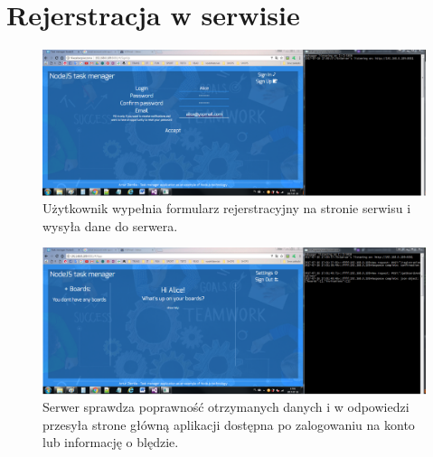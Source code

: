 \documentclass[12pt]{report}
\begin{document}
\section{Rejerstracja w serwisie}
\begin{figure}[!hb]
\centering
\includegraphics[width=\textwidth,height=\textheight,keepaspectratio]{21.png}
\captionsetup{labelformat=empty}
\caption[]{Użytkownik wypełnia formularz rejerstracyjny na stronie serwisu i wysyła dane do serwera. }
\end{figure}
\begin{figure}[!hb]
\centering
\includegraphics[width=\textwidth,height=\textheight,keepaspectratio]{22.png}
\captionsetup{labelformat=empty}
\caption[]{Serwer sprawdza poprawność otrzymanych danych i w odpowiedzi przesyła strone główną aplikacji dostępna po zalogowaniu na konto lub informację o blędzie.}
\end{figure}
\end{document}
